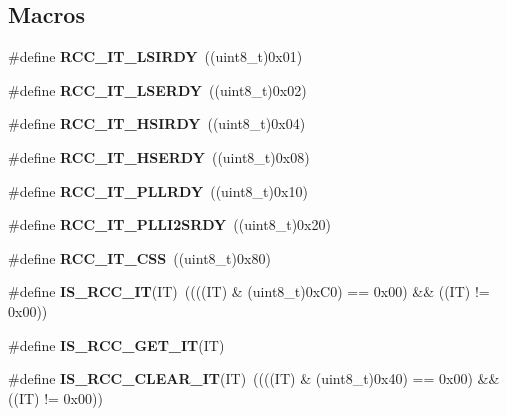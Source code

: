 \subsection*{Macros}
\begin{DoxyCompactItemize}
\item 
\mbox{\label{group___r_c_c___interrupt___source_ga2b4ef277c1b71f96e0bef4b9a72fca94}} 
\#define {\bfseries R\+C\+C\+\_\+\+I\+T\+\_\+\+L\+S\+I\+R\+DY}~((uint8\+\_\+t)0x01)
\item 
\mbox{\label{group___r_c_c___interrupt___source_gad6b6e78a426850f595ef180d292a673d}} 
\#define {\bfseries R\+C\+C\+\_\+\+I\+T\+\_\+\+L\+S\+E\+R\+DY}~((uint8\+\_\+t)0x02)
\item 
\mbox{\label{group___r_c_c___interrupt___source_ga69637e51b71f73f519c8c0a0613d042f}} 
\#define {\bfseries R\+C\+C\+\_\+\+I\+T\+\_\+\+H\+S\+I\+R\+DY}~((uint8\+\_\+t)0x04)
\item 
\mbox{\label{group___r_c_c___interrupt___source_gad13eaede352bca59611e6cae68665866}} 
\#define {\bfseries R\+C\+C\+\_\+\+I\+T\+\_\+\+H\+S\+E\+R\+DY}~((uint8\+\_\+t)0x08)
\item 
\mbox{\label{group___r_c_c___interrupt___source_ga68d48e7811fb58f2649dce6cf0d823d9}} 
\#define {\bfseries R\+C\+C\+\_\+\+I\+T\+\_\+\+P\+L\+L\+R\+DY}~((uint8\+\_\+t)0x10)
\item 
\mbox{\label{group___r_c_c___interrupt___source_ga6468ff3bad854272cf1120ffbf69b7ac}} 
\#define {\bfseries R\+C\+C\+\_\+\+I\+T\+\_\+\+P\+L\+L\+I2\+S\+R\+DY}~((uint8\+\_\+t)0x20)
\item 
\mbox{\label{group___r_c_c___interrupt___source_ga9bb34a4912d2084dc1c0834eb53aa7a3}} 
\#define {\bfseries R\+C\+C\+\_\+\+I\+T\+\_\+\+C\+SS}~((uint8\+\_\+t)0x80)
\item 
\mbox{\label{group___r_c_c___interrupt___source_ga710d72ccf88ddbec09b033c81a571a83}} 
\#define {\bfseries I\+S\+\_\+\+R\+C\+C\+\_\+\+IT}(IT)~((((IT) \& (uint8\+\_\+t)0x\+C0) == 0x00) \&\& ((\+I\+T) != 0x00))
\item 
\#define {\bfseries I\+S\+\_\+\+R\+C\+C\+\_\+\+G\+E\+T\+\_\+\+IT}(IT)
\item 
\mbox{\label{group___r_c_c___interrupt___source_ga8374741e47d696accd1a72647650ba63}} 
\#define {\bfseries I\+S\+\_\+\+R\+C\+C\+\_\+\+C\+L\+E\+A\+R\+\_\+\+IT}(IT)~((((IT) \& (uint8\+\_\+t)0x40) == 0x00) \&\& ((\+I\+T) != 0x00))
\end{DoxyCompactItemize}



